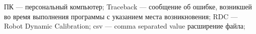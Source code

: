 \newpage
\begin{abbreviations}


ПК --- персональный компьютер;
Traceback --- сообщение об ошибке, возникшей во время выполнения программы с указанием места возникновения;
RDC --- Robot Dynamic Calibration;
csv --- comma separated value расширение файла;


\end{abbreviations}
